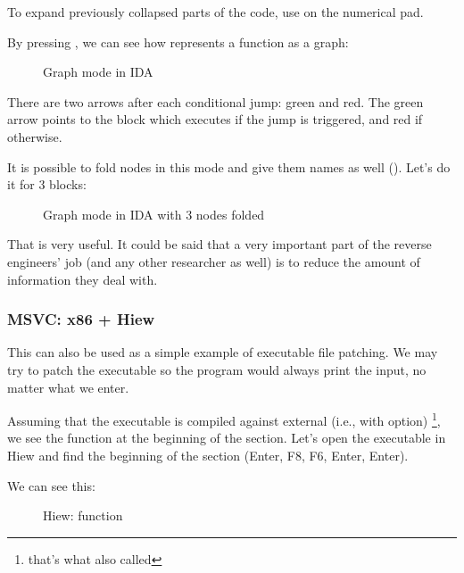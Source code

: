 To expand previously collapsed parts of the code, use \q{+} on the numerical pad.

\clearpage
By pressing , we can see how \IDA represents a function as a graph:

\begin{figure}[H]
\centering
{}
\caption{Graph mode in IDA}
\label{fig:ex3_IDA_1}
\end{figure}

There are two arrows after each conditional jump: green and red.
The green arrow points to the block which executes if the jump is triggered, and red if otherwise.

\clearpage
It is possible to fold nodes in this mode and give them names as well ().
Let's do it for 3 blocks:

\begin{figure}[H]
\centering
{}
\caption{Graph mode in IDA with 3 nodes folded}
\label{fig:ex3_IDA_2}
\end{figure}

That is very useful.
It could be said that a very important part of the reverse engineers' job (and any other researcher as well) is to reduce the amount of information they deal with.



\clearpage
\subsubsection{MSVC: x86 + Hiew}

This can also be used as a simple example of executable file patching.
We may try to patch the executable so the program would always print the input, no matter what we enter.

Assuming that the executable is compiled against external  (i.e., with  option)
\footnote{that's what also called }, 
we see the \main function at the beginning of the  section.
Let's open the executable in Hiew and find the beginning of the  section (Enter, F8, F6, Enter, Enter).

We can see this:

\begin{figure}[H]
\centering
{}
\caption{Hiew: \main function}
\label{fig:scanf_ex3_hiew_1}
\end{figure}

